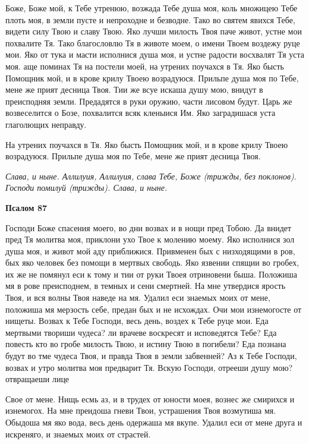    Боже, Боже мой, к Тебе утренюю, возжада Тебе душа моя, коль
множицею Тебе плоть моя, в земли пусте и непроходне и безводне. Тако во
святем явихся Тебе, видети силу Твою и славу Твою. Яко лучши милость
Твоя паче живот, устне мои похвалите Тя. Тако благословлю Тя в животе
моем, о имени Твоем воздежу руце мои. Яко от тука и масти исполнися душа
моя, и устне радости восхвалят Тя уста моя. аще поминах Тя на постели
моей, на утрених поучахся в Тя. Яко бысть Помощник мой, и в крове крилу
Твоею возрадуюся. Прильпе душа моя по Тебе, мене же прият десница Твоя.
Тии же всуе искаша душу мою, внидут в преисподняя земли. Предадятся в
руки оружию, части лисовом будут. Царь же возвеселится о Бозе,
похвалится всяк кленыися Им. Яко заградишася уста глаголющих
неправду.


   На утрених поучахся в Тя. Яко бысть Помощник мой, и в крове крилу
Твоею возрадуюся. Прильпе душа моя по Тебе, мене же прият десница
Твоя.


 \itshape Слава, и ныне\normalfont{}. Аллилуия, Аллилуия, слава Тебе, Боже \itshape (трижды, без
поклонов)\normalfont{}. Господи помилуй \itshape (трижды)\normalfont{}. \itshape Слава, и ныне\normalfont{}.






 

\bfseries Псалом 87\normalfont{}


   Господи Боже спасения моего, во дни возвах и в нощи пред Тобою. Да
внидет пред Тя молитва моя, приклони ухо Твое к молению моему. Яко
исполнися зол душа моя, и живот мой аду приближися. Привменен бых с
низходящими в ров, бых яко человек без помощи в мертвых свободь. Яко
язвении спящии во гробех, их же не помянул еси к тому и тии от руки Твоея
отриновени быша. Положиша мя в рове преисподнем, в темных и сени
смертней. На мне утвердися ярость Твоя, и вся волны Твоя наведе на мя.
Удалил еси знаемых моих от мене, положиша мя мерзость себе, предан бых и
не исхождах. Очи мои изнемогосте от нищеты. Возвах к Тебе Господи, весь
день, воздех к Тебе руце мои. Еда мертвыми твориши чудеса? ли врачеве
воскресят и исповедятся Тебе? Еда повесть кто во гробе милость Твою, и
истину Твою в погибели? Еда познана будут во тме чудеса Твоя, и правда
Твоя в земли забвенней? Аз к Тебе Господи, возвах и утро молитва моя
предварит Тя. Вскую Господи, отрееши душу мою? отвращаеши лице

Свое от мене. Нищь есмь аз, и в трудех от юности моея, вознес же
смирихся и изнемогох. На мне преидоша гневи Твои, устрашения
Твоя возмутиша мя. Обыдоша мя яко вода, весь день одержаша мя
вкупе. Удалил еси от мене друга и искреняго, и знаемых моих от
страстей.



